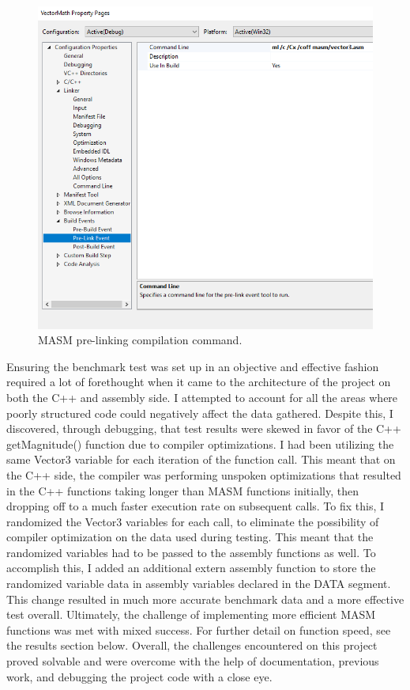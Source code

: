 \documentclass[12pt]{article}
\begin{document}
\begin{figure}[!htb]
  \centering
  \includegraphics[scale=0.75]{img/link_event.PNG}
  \caption{MASM pre-linking compilation command.}
  \label{fig:link}
\end{figure}

\noindent Ensuring the benchmark test was set up in an objective and effective fashion required a lot of forethought when it came to the architecture of the project on both the C++ and assembly side. I attempted to account for all the areas where poorly structured code could negatively affect the data gathered. Despite this, I discovered, through debugging, that test results were skewed in favor of the C++ getMagnitude() function due to compiler optimizations. I had been utilizing the same Vector3 variable for each iteration of the function call. This meant that on the C++ side, the compiler was performing unspoken optimizations that resulted in the C++ functions taking longer than MASM functions initially, then dropping off to a much faster execution rate on subsequent calls. To fix this, I randomized the Vector3 variables for each call, to eliminate the possibility of compiler optimization on the data used during testing. This meant that the randomized variables had to be passed to the assembly functions as well. To accomplish this, I added an additional extern assembly function to store the randomized variable data in assembly variables declared in the DATA segment. This change resulted in much more accurate benchmark data and a more effective test overall. 
\newline
\newline
Ultimately, the challenge of implementing more efficient MASM functions was met with mixed success. For further detail on function speed, see the results section below. Overall, the challenges encountered on this project proved solvable and were overcome with the help of documentation, previous work, and debugging the project code with a close eye.
\end{document}
